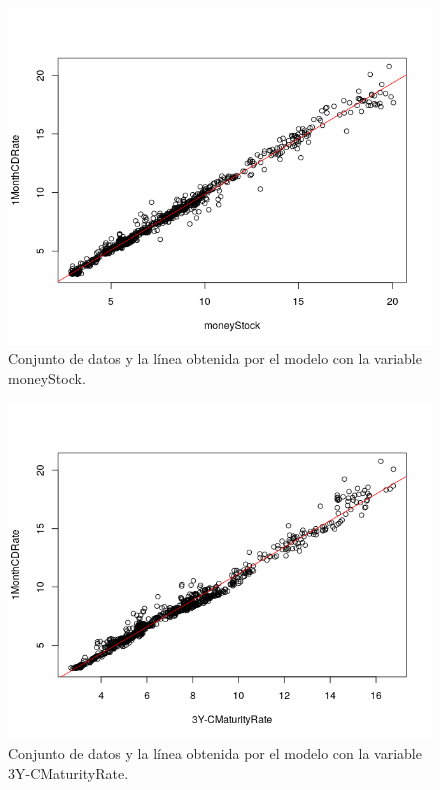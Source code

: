 \documentclass[12pt,a4paper]{article}
\begin{document}
\begin{figure}[H]
	\centering 
	\includegraphics[scale=0.65]{./Imagenes/Regresion/abline_moneyStock.png}
	\caption{Conjunto de datos y la línea obtenida por el modelo con la variable moneyStock.}
\end{figure}

\begin{figure}[H]
	\centering 
	\includegraphics[scale=0.65]{./Imagenes/Regresion/abline_3Y_CMaturityRate.png}
	\caption{Conjunto de datos y la línea obtenida por el modelo con la variable 3Y-CMaturityRate.}
\end{figure}
\end{document}
